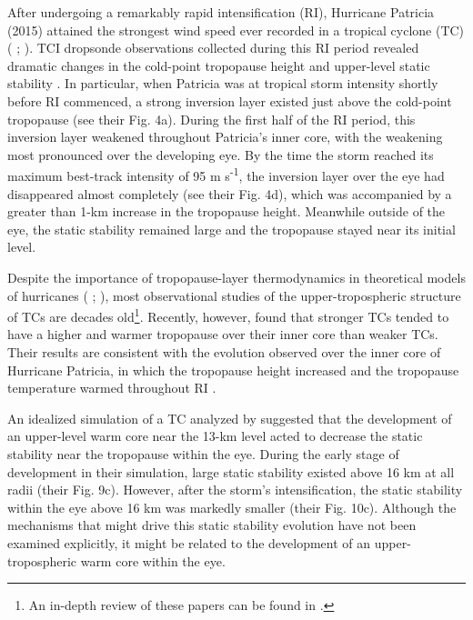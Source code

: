 \documentclass{ametsoc}
\begin{document}
After undergoing a remarkably rapid intensification (RI), Hurricane Patricia (2015) attained the strongest wind speed ever recorded in a tropical cyclone (TC) (\citeauthor{Kimberlainetal2016} \citeyear{Kimberlainetal2016}; \citeauthor{Rogersetal2017} \citeyear{Rogersetal2017}).
TCI dropsonde observations collected during this RI period revealed dramatic changes in the cold-point tropopause height and upper-level static stability \citep{DuranMolinari2018}.
In particular, when Patricia was at tropical storm intensity shortly before RI commenced, a strong inversion layer existed just above the cold-point tropopause (see their Fig. 4a).
During the first half of the RI period, this inversion layer weakened throughout Patricia's inner core, with the weakening most pronounced over the developing eye.
By the time the storm reached its maximum best-track intensity of 95 m s\textsuperscript{-1}, the inversion layer over the eye had disappeared almost completely (see their Fig. 4d), which was accompanied by a greater than 1-km increase in the tropopause height.
Meanwhile outside of the eye, the static stability remained large and the tropopause stayed near its initial level.

Despite the importance of tropopause-layer thermodynamics in theoretical models of hurricanes (\citeauthor{EmanuelRotunno2011} \citeyear{EmanuelRotunno2011}; \citeauthor{Emanuel2012} \citeyear{Emanuel2012}), most observational studies of the upper-tropospheric structure of TCs are decades old\footnote{An in-depth review of these papers can be found in \cite{DuranMolinari2018}.}.
Recently, however, \cite{KomaromiDoyle2017} found that stronger TCs tended to have a higher and warmer tropopause over their inner core than weaker TCs.
Their results are consistent with the evolution observed over the inner core of Hurricane Patricia, in which the tropopause height increased and the tropopause temperature warmed throughout RI \citep{DuranMolinari2018}.

An idealized simulation of a TC analyzed by \cite{OhnoSatoh2015} suggested that the development of an upper-level warm core near the 13-km level acted to decrease the static stability near the tropopause within the eye.
During the early stage of development in their simulation, large static stability existed above 16 km at all radii (their Fig. 9c).
However, after the storm's intensification, the static stability within the eye above 16 km was markedly smaller (their Fig. 10c).
Although the mechanisms that might drive this static stability evolution have not been examined explicitly, it might be related to the development of an upper-tropospheric warm core within the eye.
\end{document}
